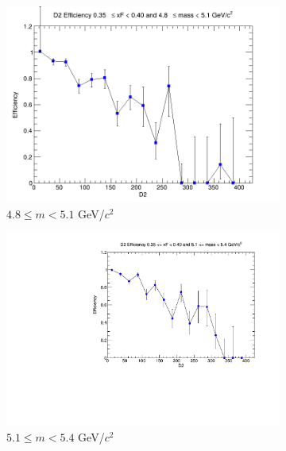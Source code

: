 \begin{figure}[p]
\begin{subfigure}[b]{0.32\textwidth}
        \centering
        \includegraphics[width=\textwidth]{./kTrackerEfficiencyPlots/D2_Efficiency_xF7_mass2.png}
        \caption{$4.8 \leq m < 5.1$ GeV/$c^2$}
        \label{fig:xF7_mass2}
    \end{subfigure}
    \vspace{0.5cm}
    \begin{subfigure}[b]{0.32\textwidth}
        \centering
        \includegraphics[width=\textwidth]{./kTrackerEfficiencyPlots/D2_Efficiency_xF7_mass3.pdf}
        \caption{$5.1 \leq m < 5.4$ GeV/$c^2$}
        \label{fig:xF7_mass3}
    \end{subfigure}
    \hfill
    \begin{subfigure}[b]{0.32\textwidth}
        \centering

\end{subfigure}
\end{figure}

